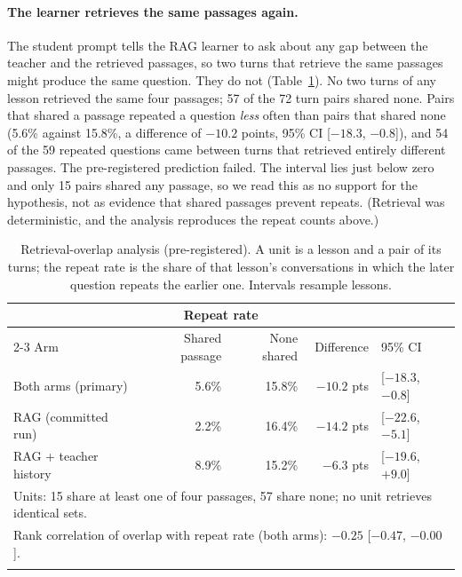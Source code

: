 \documentclass[pdflatex,sn-mathphys-num]{sn-jnl}%
\theoremstyle{thmstyleone}%
\theoremstyle{thmstyletwo}%
\theoremstyle{thmstylethree}%
\begin{document}
\paragraph{The learner retrieves the same passages again.} The student prompt tells the RAG learner to
ask about any gap between the teacher and the retrieved passages, so two turns that retrieve the same
passages might produce the same question. They do not (Table~\ref{tab:retrieval}). No two turns of any
lesson retrieved the same four passages; 57 of the 72 turn pairs shared none. Pairs that shared a
passage repeated a question \emph{less} often than pairs that shared none (5.6\% against 15.8\%, a
difference of $-10.2$ points, 95\% CI [$-18.3$, $-0.8$]), and 54 of the 59 repeated questions came
between turns that retrieved entirely different passages. The pre-registered prediction failed. The
interval lies just below zero and only 15 pairs shared any passage, so we read this as no support for
the hypothesis, not as evidence that shared passages prevent repeats. (Retrieval was deterministic,
and the analysis reproduces the repeat counts above.)

\begin{table}[t]
\caption{Retrieval-overlap analysis (pre-registered). A unit is a lesson and a pair of its turns;
the repeat rate is the share of that lesson's conversations in which the later question repeats the
earlier one. Intervals resample lessons.}\label{tab:retrieval}
\footnotesize
\begin{tabular*}{\textwidth}{@{\extracolsep\fill}lrrrl}
\toprule
& \multicolumn{2}{c}{Repeat rate} & & \\
\cmidrule(lr){2-3}
Arm & Shared passage & None shared & Difference & 95\% CI \\
\midrule
Both arms (primary) & 5.6\% & 15.8\% & $-10.2$ pts & [$-18.3$, $-0.8$] \\
RAG (committed run) & 2.2\% & 16.4\% & $-14.2$ pts & [$-22.6$, $-5.1$] \\
RAG + teacher history & 8.9\% & 15.2\% & $-6.3$ pts & [$-19.6$, $+9.0$] \\
\midrule
\multicolumn{5}{l}{Units: 15 share at least one of four passages, 57 share none; no unit retrieves identical sets.} \\
\multicolumn{5}{l}{Rank correlation of overlap with repeat rate (both arms): $-0.25$ [$-0.47$, $-0.00$].} \\
\botrule
\end{tabular*}
\end{table}
\end{document}
